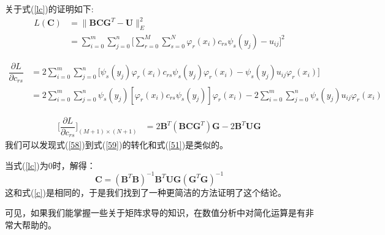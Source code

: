 关于式(\ref{lc})的证明如下:
\begin{align}
L(\bm{C})&={\|{\bm{B}\bm{C}\bm{G}^T-\bm{U}}\|_{E}^2}\\
&=\sum\limits_{i = 0}^{m} {\sum\limits_{j = 0}^{n} \Bigg[{\sum_{r = 0}^M \sum_{s = 0}^N 
\varphi_{r}(x_i)c_{rs}\psi_{s}(y_j) - u_{ij}}\Bigg]^2} 
\end{align}

\begin{align}
\dfrac{\partial L}{\partial c_{rs}}&=
2\sum\limits_{i = 0}^{m} \sum\limits_{j = 0}^{n} \Big[\psi_{s}(y_j)\varphi_{r}(x_i)c_{rs}\psi_{s}(y_j)\varphi_{r}(x_i)-\psi_{s}(y_j) u_{ij}\varphi_{r}(x_i)\Big] \\
&=
2\sum\limits_{i = 0}^{m} \sum\limits_{j = 0}^{n} \psi_{s}(y_j)[\varphi_{r}(x_i)c_{rs}\psi_{s}(y_j)]\varphi_{r}(x_i)-
2\sum\limits_{i = 0}^{m} \sum\limits_{j = 0}^{n}\psi_{s}(y_j) u_{ij}\varphi_{r}(x_i)
\label{58}
\end{align}

\begin{align}
\label{59}
\Big[\dfrac{\partial L}{\partial c_{rs}}\Big]_{(M+1)\times (N+1)}&=2\bm{B}^T(\bm{B}\bm{C}\bm{G}^T)\bm{G}-2\bm{B}^T\bm{U}\bm{G}
\end{align}
我们可以发现式(\ref{58})到式(\ref{59})的转化和式(\ref{51})是类似的。

当式(\ref{lc})为0时，解得：
\begin{equation}
\label{cc}
\bm{C}=(\bm{B}^T\bm{B})^{-1}\bm{B}^T\bm{U}\bm{G}(\bm{G}^T\bm{G})^{-1}
\end{equation}
这和式(\ref{c})是相同的，于是我们找到了一种更简洁的方法证明了这个结论。


可见，如果我们能掌握一些关于矩阵求导的知识，在数值分析中对简化运算是有非常大帮助的。


